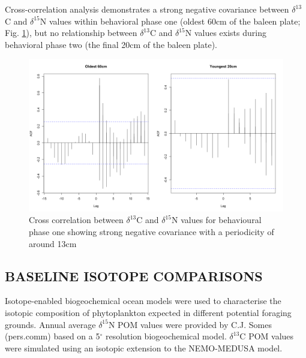 \documentclass[a4paper,12pt]{article}
\begin{document}
Cross-correlation analysis demonstrates a strong negative covariance between $\delta^{13}$C and $\delta^{15}$N values within behavioral phase one (oldest 60cm of the baleen plate; Fig. \ref{figs2}), but no relationship between $\delta^{13}$C and $\delta^{15}$N values exists during behavioral phase two (the final 20cm of the baleen plate). 

\begin{figure}[!htbp]
  \centering
  \includegraphics[width = \linewidth]{figures/Figure-S2-cross-cor.png}
  \caption{Cross correlation between $\delta^{13}$C and $\delta^{15}$N values for behavioural phase one showing strong negative covariance with a periodicity of around 13cm} %
  \label{figs2}
\end{figure}
 
\subsection*{BASELINE ISOTOPE COMPARISONS}
Isotope-enabled biogeochemical ocean models\cite{magozzi2017using,schmittner2016complementary} were used to characterise the isotopic composition of phytoplankton expected in different potential foraging grounds. 
Annual average $\delta^{15}$N POM values were provided by C.J. Somes (pers.comm) based on a 5$^{\circ}$ resolution biogeochemical model. 
$\delta^{13}$C POM values were simulated using an isotopic extension to the NEMO-MEDUSA model\cite{magozzi2017using}.
 
\end{document}
